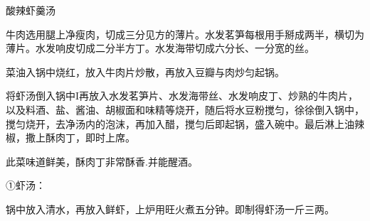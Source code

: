 \begin{recipe}{酸辣虾羹汤}

\ingredients


\cooking

\step 牛肉选用腿上净瘦肉，切成三分见方的薄片。水发茗笋每根用手掰成两半，横切为薄片。水发响皮切成二分半方丁。水发海带切成六分长、一分宽的丝。

\step 菜油入锅中烧红，放入牛肉片炒散，再放入豆瓣与肉炒匀起锅。

\step 将虾汤倒入锅中I再放入水发茗笋片、水发海带丝、水发响皮丁、炒熟的牛肉片，以及料酒、盐、酱油、胡椒面和味精等烧开，随后将水豆粉搅匀，徐徐倒入锅中，搅匀烧开，去净汤内的泡沫，再加入醋，搅匀后即起锅，盛入碗中。最后淋上油辣椒，撒上酥肉丁，即时上席。

\notes

此菜味道鲜美，酥肉丁非常酥香.并能醒酒。

①虾汤：

\ingredients


\cooking

锅中放入清水，再放入鲜虾，上炉用旺火煮五分钟。即制得虾汤一斤三两。

\end{recipe}

